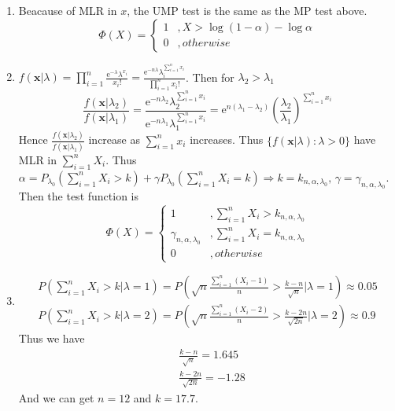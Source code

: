 \documentclass{article}
\begin{document}
\begin{enumerate}[leftmargin = 0 em, label = \arabic*., font = \bfseries]
\begin{enumerate}
		 \item 
		  Beacause of MLR in $x$, the UMP test is the same as the MP test above.
		  \[\Phi(X) = \begin{cases}
			1 & , X > \log (1 - \alpha) - \log \alpha\\
			0 & , otherwise
		\end{cases}\]



		\item 
		$f(\bm x | \lambda) = \prod_{i=1}^n \frac{\mathrm{e}^{ - \lambda} \lambda^{x_i}}{x_i!} = \frac{\mathrm{e}^{- n \lambda} \lambda_i^{\sum_{i=1}^n x_i}}{\prod_{i=1}^n x_i!}$. Then for $\lambda_2 > \lambda_1$
		\[\frac{f(\bm x|\lambda_2)}{f(\bm x | \lambda_1)} = \frac{\mathrm{e}^{-n \lambda_2} \lambda_2 ^{\sum_{i=1}^n x_i}}{\mathrm{e}^{-n \lambda_1} \lambda_1^{\sum_{i=1}^n x_i}} = \mathrm{e}^{n(\lambda_1 - \lambda_2)} \left(\frac{\lambda_2}{\lambda_1}\right)^{\sum_{i=1}^n x_i}\]
		Hence $\frac{f(\bm x | \lambda_2)}{f(\bm x | \lambda_1)}$ increase as $\sum_{i=1}^n x_i$ increases. Thus $\{f(\bm x | \lambda): \lambda > 0\}$ have MLR in $\sum_{i=1}^n X_i$. Thus $\alpha = P_{\lambda_0}(\sum_{i=1}^n X_i > k) + \gamma P_{\lambda_0} (\sum_{i=1}^n X_i = k) \Rightarrow k = k_{n, \alpha, \lambda_0},\, \gamma = \gamma_{n, \alpha , \lambda_0}$. Then the test function is 
		\[\Phi(X) = \begin{cases}
			1 & , \sum_{i=1}^n X_i > k_{n, \alpha , \lambda_0}\\
			\gamma_{n, \alpha, \lambda_0} & , \sum_{i=1}^n X_i = k_{n, \alpha , \lambda_0}\\
			0 & , otherwise
		\end{cases}\] 

		\item 
		\begin{align*}
		P\left( \sum_{i=1}^n X_i > k \bigg| \lambda = 1 \right) = P\left(\sqrt{n}\frac{\sum_{i=1}^n (X_i - 1)}{n} > \frac{k - n}{\sqrt{n}}\bigg| \lambda = 1\right) \approx 0.05\\
		P\left( \sum_{i=1}^n X_i > k \bigg| \lambda = 2 \right) = P\left(\sqrt{n}\frac{\sum_{i=1}^n (X_i - 2)}{n} > \frac{k - 2 n}{\sqrt{2n}}\bigg| \lambda = 2\right) \approx 0.9
		\end{align*}
		Thus we have 
		\begin{align*}
		&\frac{k - n}{\sqrt{n}} = 1.645\\
		&\frac{k - 2n}{\sqrt{2n}} = -1.28
		\end{align*}
		And we can get $n = 12$ and $k = 17.7$.
		


\end{enumerate}
\end{enumerate}
\end{document}
